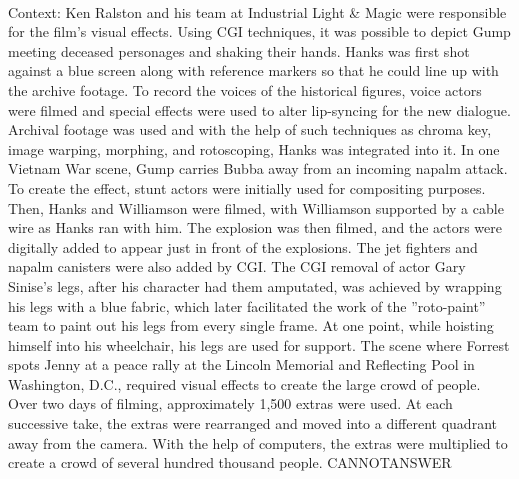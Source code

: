 \documentclass[11pt,a4paper, onecolumn]{article}
\begin{document}
\\ Context: Ken Ralston and his team at Industrial Light & Magic were responsible for the film's visual effects. Using CGI techniques, it was possible to depict Gump meeting deceased personages and shaking their hands. Hanks was first shot against a blue screen along with reference markers so that he could line up with the archive footage. To record the voices of the historical figures, voice actors were filmed and special effects were used to alter lip-syncing for the new dialogue. Archival footage was used and with the help of such techniques as chroma key, image warping, morphing, and rotoscoping, Hanks was integrated into it. In one Vietnam War scene, Gump carries Bubba away from an incoming napalm attack. To create the effect, stunt actors were initially used for compositing purposes. Then, Hanks and Williamson were filmed, with Williamson supported by a cable wire as Hanks ran with him. The explosion was then filmed, and the actors were digitally added to appear just in front of the explosions. The jet fighters and napalm canisters were also added by CGI. The CGI removal of actor Gary Sinise's legs, after his character had them amputated, was achieved by wrapping his legs with a blue fabric, which later facilitated the work of the ''roto-paint'' team to paint out his legs from every single frame. At one point, while hoisting himself into his wheelchair, his legs are used for support. The scene where Forrest spots Jenny at a peace rally at the Lincoln Memorial and Reflecting Pool in Washington, D.C., required visual effects to create the large crowd of people. Over two days of filming, approximately 1,500 extras were used. At each successive take, the extras were rearranged and moved into a different quadrant away from the camera. With the help of computers, the extras were multiplied to create a crowd of several hundred thousand people. CANNOTANSWER
\end{document}
